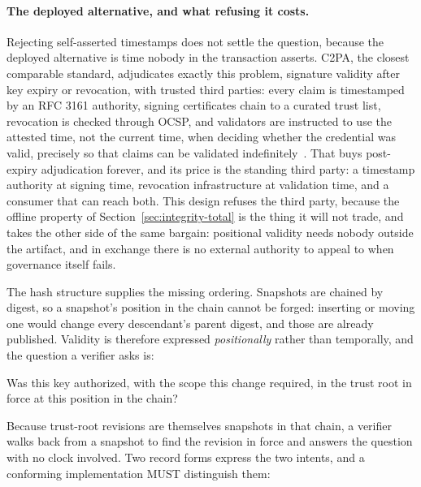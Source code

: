 \documentclass[11pt,a4paper]{article}
\begin{document}
\paragraph{The deployed alternative, and what refusing it costs.}
Rejecting self-asserted timestamps does not settle the question, because the
deployed alternative is time nobody in the transaction asserts. C2PA, the
closest comparable standard, adjudicates exactly this problem, signature
validity after key expiry or revocation, with trusted third parties: every
claim is timestamped by an RFC 3161 authority, signing certificates chain to a
curated trust list, revocation is checked through OCSP, and validators are
instructed to use the attested time, not the current time, when deciding
whether the credential was valid, precisely so that claims can be validated
indefinitely~\cite{c2pa_spec, rfc3161}. That buys post-expiry adjudication
forever, and its price is the standing third party: a timestamp authority at
signing time, revocation infrastructure at validation time, and a consumer
that can reach both. This design refuses the third party, because the offline
property of Section~\ref{sec:integrity-total} is the thing it will not trade,
and takes the other side of the same bargain: positional validity needs
nobody outside the artifact, and in exchange there is no external authority
to appeal to when governance itself fails.

The hash structure supplies the missing ordering. Snapshots are chained by
digest, so a snapshot's position in the chain cannot be forged: inserting or
moving one would change every descendant's parent digest, and those are already
published. Validity is therefore expressed \emph{positionally} rather than
temporally, and the question a verifier asks is:

\begin{callout}
Was this key authorized, with the scope this change required, in the trust root
in force at this position in the chain?
\end{callout}

Because trust-root revisions are themselves snapshots in that chain, a verifier
walks back from a snapshot to find the revision in force and answers the
question with no clock involved. Two record forms express the two intents, and a
conforming implementation MUST distinguish them:
\end{document}
